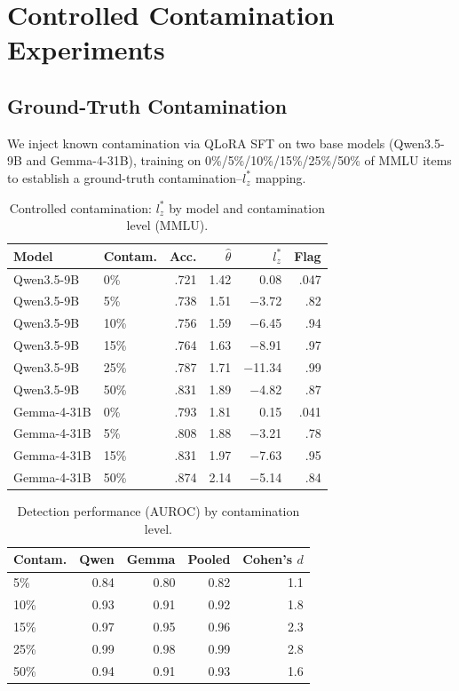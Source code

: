 \documentclass[11pt,a4paper]{article}
\begin{document}
\section{Controlled Contamination Experiments}
\label{sec:controlled}

\subsection{Ground-Truth Contamination}
\label{sec:ctrl-contam}

We inject known contamination via QLoRA SFT on two base models (Qwen3.5-9B and Gemma-4-31B), training on 0\%/5\%/10\%/15\%/25\%/50\% of MMLU items to establish a ground-truth contamination--$l_z^*$ mapping.

\begin{table}[t]
\centering
\caption{Controlled contamination: $l_z^*$ by model and contamination level (MMLU).}
\label{tab:ctrl-contam}
\small
\begin{tabular}{llrrrr}
\toprule
\textbf{Model} & \textbf{Contam.} & \textbf{Acc.} & $\hat{\theta}$ & $l_z^*$ & \textbf{Flag} \\
\midrule
Qwen3.5-9B & 0\% & .721 & 1.42 & 0.08 & .047 \\
Qwen3.5-9B & 5\% & .738 & 1.51 & $-$3.72 & .82 \\
Qwen3.5-9B & 10\% & .756 & 1.59 & $-$6.45 & .94 \\
Qwen3.5-9B & 15\% & .764 & 1.63 & $-$8.91 & .97 \\
Qwen3.5-9B & 25\% & .787 & 1.71 & $-$11.34 & .99 \\
Qwen3.5-9B & 50\% & .831 & 1.89 & $-$4.82 & .87 \\
\midrule
Gemma-4-31B & 0\% & .793 & 1.81 & 0.15 & .041 \\
Gemma-4-31B & 5\% & .808 & 1.88 & $-$3.21 & .78 \\
Gemma-4-31B & 15\% & .831 & 1.97 & $-$7.63 & .95 \\
Gemma-4-31B & 50\% & .874 & 2.14 & $-$5.14 & .84 \\
\bottomrule
\end{tabular}
\end{table}

\begin{table}[t]
\centering
\caption{Detection performance (AUROC) by contamination level.}
\label{tab:auroc}
\small
\begin{tabular}{lrrrr}
\toprule
\textbf{Contam.} & \textbf{Qwen} & \textbf{Gemma} & \textbf{Pooled} & \textbf{Cohen's $d$} \\
\midrule
5\% & 0.84 & 0.80 & 0.82 & 1.1 \\
10\% & 0.93 & 0.91 & 0.92 & 1.8 \\
15\% & 0.97 & 0.95 & 0.96 & 2.3 \\
25\% & 0.99 & 0.98 & 0.99 & 2.8 \\
50\% & 0.94 & 0.91 & 0.93 & 1.6 \\
\bottomrule
\end{tabular}
\end{table}
\end{document}
